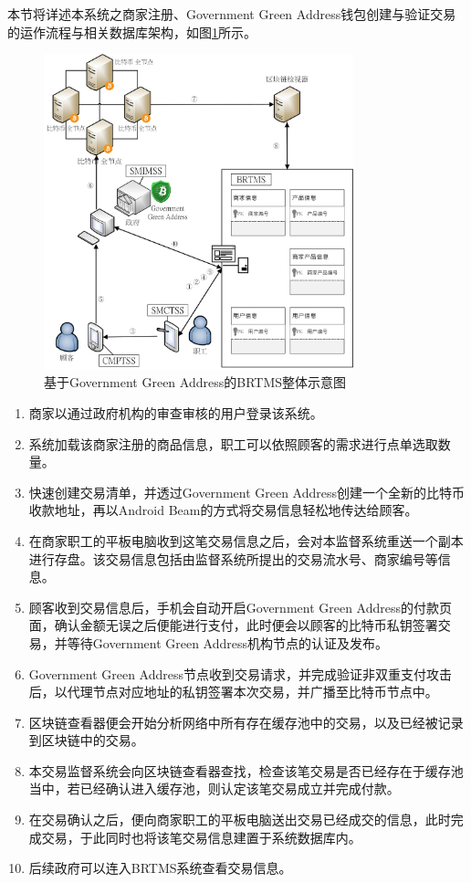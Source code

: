 本节将详述本系统之商家注册、Government Green Address钱包创建与验证交易的运作流程与相关数据库架构，如图\ref{gabpcss}所示。

	\begin{figure}[!htbp]
		\centering
		\includegraphics[width = 0.8\textwidth]{gabpcss.jpg}
		\caption{基于Government Green Address的BRTMS整体示意图}\label{gabpcss}
	\end{figure}

	\begin{enumerate}
		\item 商家以通过政府机构的审查审核的用户登录该系统。
		\item 系统加载该商家注册的商品信息，职工可以依照顾客的需求进行点单选取数量。
		\item 快速创建交易清单，并透过Government Green Address创建一个全新的比特币收款地址，再以Android Beam的方式将交易信息轻松地传达给顾客。
		\item 在商家职工的平板电脑收到这笔交易信息之后，会对本监督系统重送一个副本进行存盘。该交易信息包括由监督系统所提出的交易流水号、商家编号等信息。
		\item 顾客收到交易信息后，手机会自动开启Government Green Address的付款页面，确认金额无误之后便能进行支付，此时便会以顾客的比特币私钥签署交易，并等待Government Green Address机构节点的认证及发布。
		\item Government Green Address节点收到交易请求，并完成验证非双重支付攻击后，以代理节点对应地址的私钥签署本次交易，并广播至比特币节点中。
		\item 区块链查看器便会开始分析网络中所有存在缓存池中的交易，以及已经被记录到区块链中的交易。
		\item 本交易监督系统会向区块链查看器查找，检查该笔交易是否已经存在于缓存池当中，若已经确认进入缓存池，则认定该笔交易成立并完成付款。
		\item 在交易确认之后，便向商家职工的平板电脑送出交易已经成交的信息，此时完成交易，于此同时也将该笔交易信息建置于系统数据库内。
		\item 后续政府可以连入BRTMS系统查看交易信息。
	\end{enumerate}